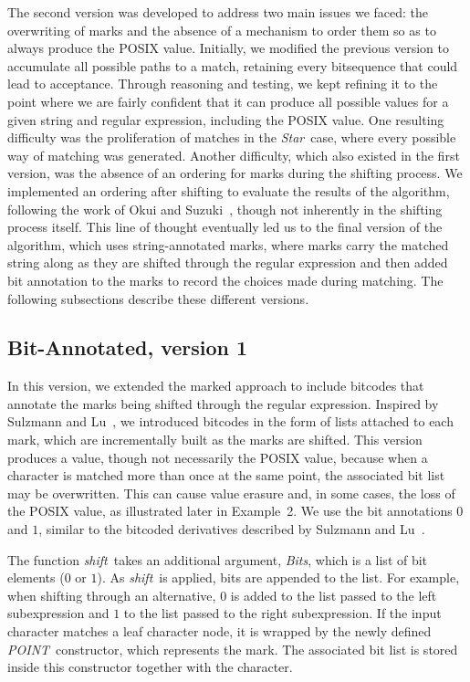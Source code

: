 \documentclass[12pt]{article}
\newcommand{\shift}{\textit{shift}}
\newcommand{\Star}{\textit{Star}}
\newcommand{\Bits}{\textit{Bits}}
\newcommand{\POINT}{\textit{POINT}}
\begin{document}
The second version was developed to address two main issues we faced: 
the overwriting of marks and the absence of a mechanism to order them so as to 
always produce the POSIX value. Initially, we modified the previous version to 
accumulate all possible paths to a match, retaining every bitsequence that 
could lead to acceptance. Through reasoning and testing, we kept refining it 
to the point where we are fairly confident that it can produce all possible 
values for a given string and regular expression, including the POSIX value.  
One resulting difficulty was the proliferation of matches in the \Star\ case, 
where every possible way of matching was generated. Another difficulty, which 
also existed in the first version, was the absence of an ordering for marks 
during the shifting process. We implemented an ordering after shifting to 
evaluate the results of the algorithm, following the work of Okui and 
Suzuki~\cite{OkuiSuzuki2013}, though not inherently in the shifting process 
itself. This line of thought eventually led us to the final version of the 
algorithm, which uses string-annotated marks, where marks carry the matched 
string along as they are shifted through the regular expression and then added 
bit annotation to the marks to record the choices made during matching.
The following subsections describe these different versions.

\FloatBarrier
\subsection{Bit-Annotated, version 1}

In this version, we extended the marked approach to include bitcodes 
that annotate the marks being shifted through the regular expression. Inspired by Sulzmann and Lu~\cite{Sulzmann2014}, we introduced bitcodes in the form 
of lists attached to each mark, which are incrementally built as the marks are shifted.  
This version produces a value, though not necessarily the POSIX value, because when a character is matched 
more than once at the same point, the associated bit list may be overwritten.  
This can cause value erasure and, in some cases, the loss of the POSIX value, as illustrated later in Example~2.  
We use the bit annotations $0$ and $1$, similar to the bitcoded derivatives described by Sulzmann and Lu~\cite{Sulzmann2014}.  

The function \shift\ takes an additional argument, \Bits, which is a list of bit elements ($0$ or $1$).  
As \shift\ is applied, bits are appended to the list.  
For example, when shifting through an alternative, $0$ is added to the list passed to the left subexpression 
and $1$ to the list passed to the right subexpression.  
If the input character matches a leaf character node, it is wrapped by the newly defined \POINT\ constructor, 
which represents the mark.  
The associated bit list is stored inside this constructor together with the character.  
\end{document}
